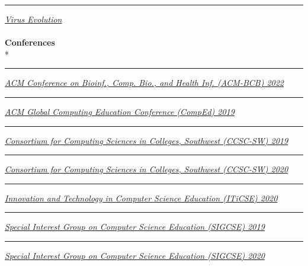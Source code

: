 \documentclass[margin,line]{res}
\begin{document}
\begin{resume}
\rule{-1mm}{5mm} \hspace*{4mm} \href{https://academic.oup.com/ve}{\textit{Virus Evolution}}\\
~\\
\textbf{Conferences}\\*
\rule{-1mm}{5mm} \hspace*{4mm} \href{https://acm-bcb.org/2022}{\textit{ACM Conference on Bioinf., Comp. Bio., and Health Inf. (ACM-BCB) 2022}}\\
\rule{-1mm}{5mm} \hspace*{4mm} \href{http://www.acmcomped.org/}{\textit{ACM Global Computing Education Conference (CompEd) 2019}}\\
\rule{-1mm}{5mm} \hspace*{4mm} \href{http://www.ccsc.org/southwestern/2019/index.php}{\textit{Consortium for Computing Sciences in Colleges, Southwest (CCSC-SW) 2019}}\\
\rule{-1mm}{5mm} \hspace*{4mm} \href{http://www.ccsc.org/southwestern/2020/index.php}{\textit{Consortium for Computing Sciences in Colleges, Southwest (CCSC-SW) 2020}}\\
\rule{-1mm}{5mm} \hspace*{4mm} \href{https://iticse.acm.org/}{\textit{Innovation and Technology in Computer Science Education (ITiCSE) 2020}}\\
\rule{-1mm}{5mm} \hspace*{4mm} \href{https://sigcse2019.sigcse.org/}{\textit{Special Interest Group on Computer Science Education (SIGCSE) 2019}}\\
\rule{-1mm}{5mm} \hspace*{4mm} \href{https://sigcse2020.sigcse.org/}{\textit{Special Interest Group on Computer Science Education (SIGCSE) 2020}}\\


\end{resume}
\end{document}
